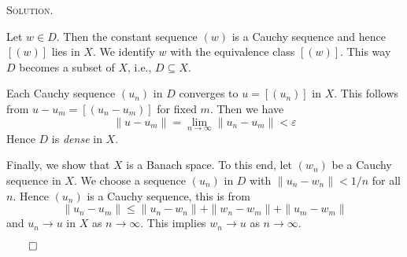 \documentclass[12pt, a4paper, oneside]{ctexart}
\newenvironment{solution}{%
	\par\noindent\textsc{Solution. }\ignorespaces
}{%
	\hfill$\qed$\par
}
\begin{document}
\begin{solution}
\begin{enumerate}[a.]
			Let \(w \in D\). Then the constant sequence \((w)\) is a Cauchy sequence and hence \([(w)]\) lies in \(X\). We identify \(w\) with the equivalence class \([(w)]\). This way \(D\) becomes a subset of \(X\), i.e., \(D \subseteq X\).
			
			Each Cauchy sequence \((u_n)\) in \(D\) converges to \(u = [(u_n)]\) in \(X\). This follows from \(u - u_m = [(u_n - u_m)]\) for fixed \(m\).  Then we have \[ \|u-u_{m}\| = \lim\limits_{n\to\infty}\|u_{n}-u_{m}\| <\varepsilon \]Hence \(D\) is \textit{dense} in \(X\).
			
			Finally, we show that \(X\) is a Banach space. To this end, let \((w_n)\) be a Cauchy sequence in \(X\). We choose a sequence \((u_n)\) in \(D\) with \(\|u_n - w_n\| < 1/n\) for all \(n\). Hence \((u_n)\) is a Cauchy sequence, this is from\[ \|u_{n}-u_{m}\|\leq\|u_{n}-w_{n}\|+\|w_{n}-w_{m}\|+\|u_{m}-w_{m}\| \] and \(u_n \to u\) in $X$ as \(n \to \infty\). This implies \(w_n \to u\) as \(n \to \infty\).
		\end{enumerate}
		
	
	\end{solution}
	
\end{document}
